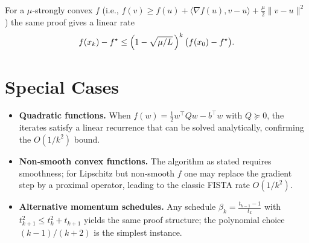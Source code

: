 \documentclass{article}
\newcommand{\grad}{\nabla}
\begin{document}
For a $ \mu$‑strongly convex $f$ (i.e., $f(v)\ge f(u)+\langle\grad f(u),v-u\rangle+\frac{\mu}{2}\|v-u\|^2$) the same proof gives a linear rate
\[
f(x_k)-f^\star \le \Bigl(1-\sqrt{\mu/L}\,\Bigr)^k\,\bigl(f(x_0)-f^\star\bigr).
\]

\section*{Special Cases}
\begin{itemize}
\item \textbf{Quadratic functions.} When $f(w)=\frac12 w^\top Q w - b^\top w$ with $Q\succeq 0$, the iterates satisfy a linear recurrence that can be solved analytically, confirming the $O(1/k^2)$ bound.
\item \textbf{Non‑smooth convex functions.} The algorithm as stated requires smoothness; for Lipschitz but non‑smooth $f$ one may replace the gradient step by a proximal operator, leading to the classic FISTA rate $O(1/k^2)$.
\item \textbf{Alternative momentum schedules.} Any schedule $\beta_k=\frac{t_{k-1}-1}{t_k}$ with $t_{k+1}^2\le t_k^2+ t_{k+1}$ yields the same proof structure; the polynomial choice $(k-1)/(k+2)$ is the simplest instance.
\end{itemize}
\end{document}
